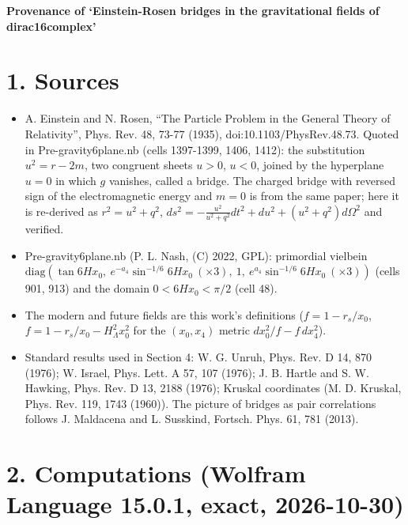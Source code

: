 \documentclass[10pt]{article}
\begin{document}
{\raggedright\LARGE\bfseries Provenance of `Einstein-Rosen bridges in the gravitational fields of dirac16complex'\par}\medskip

\section*{1. Sources}

\begin{itemize}
\item A. Einstein and N. Rosen, ``The Particle Problem in the General Theory of Relativity'', Phys. Rev. 48, 73-77 (1935), doi:10.1103/PhysRev.48.73. Quoted in Pre-gravity6plane.nb (cells 1397-1399, 1406, 1412): the substitution $u^2 = r - 2m$, two congruent sheets $u>0$, $u<0$, joined by the hyperplane $u = 0$ in which $g$ vanishes, called a bridge. The charged bridge with reversed sign of the electromagnetic energy and $m=0$ is from the same paper; here it is re-derived as $r^2 = u^2 + q^2$, $ds^2 = -\frac{u^2}{u^2+q^2}dt^2 + du^2 + (u^2+q^2)d\Omega^2$ and verified.
\item Pre-gravity6plane.nb (P. L. Nash, (C) 2022, GPL): primordial vielbein $\mathrm{diag}(\tan 6Hx_0,\ e^{-a_4}\sin^{-1/6}6Hx_0\ (\times3),\ 1,\ e^{a_4}\sin^{-1/6}6Hx_0\ (\times3))$ (cells 901, 913) and the domain $0<6Hx_0<\pi/2$ (cell 48).
\item The modern and future fields are this work's definitions ($f = 1 - r_s/x_0$, $f = 1 - r_s/x_0 - H_\Lambda^2x_0^2$ for the $(x_0,x_4)$ metric $dx_0^2/f - f\,dx_4^2$).
\item Standard results used in Section 4: W. G. Unruh, Phys. Rev. D 14, 870 (1976); W. Israel, Phys. Lett. A 57, 107 (1976); J. B. Hartle and S. W. Hawking, Phys. Rev. D 13, 2188 (1976); Kruskal coordinates (M. D. Kruskal, Phys. Rev. 119, 1743 (1960)). The picture of bridges as pair correlations follows J. Maldacena and L. Susskind, Fortsch. Phys. 61, 781 (2013).
\end{itemize}

\section*{2. Computations (Wolfram Language 15.0.1, exact, 2026-10-30)}
\end{document}
